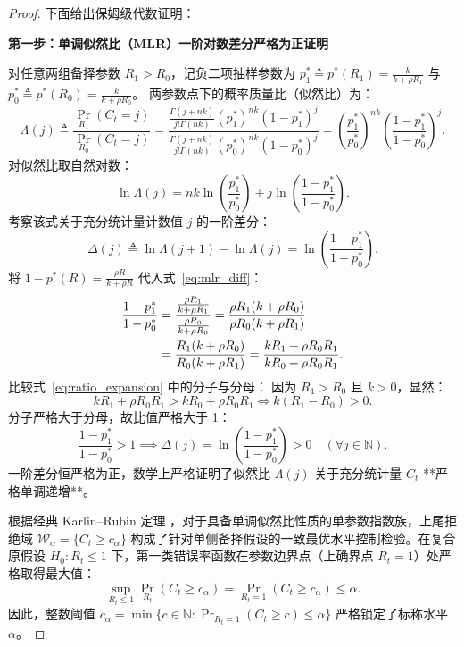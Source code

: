 \begin{proof}
下面给出保姆级代数证明：

\textbf{第一步：单调似然比（MLR）一阶对数差分严格为正证明}

对任意两组备择参数 $R_1 > R_0$，记负二项抽样参数为 $p_1^* \triangleq p^*(R_1) = \frac{k}{k + \rho R_1}$ 与 $p_0^* \triangleq p^*(R_0) = \frac{k}{k + \rho R_0}$。
两参数点下的概率质量比（似然比）为：
\begin{equation}
\Lambda(j) \triangleq \frac{\Pr_{R_1}(C_t = j)}{\Pr_{R_0}(C_t = j)} = \frac{\frac{\Gamma(j+nk)}{j!\Gamma(nk)} (p_1^*)^{nk} (1 - p_1^*)^j}{\frac{\Gamma(j+nk)}{j!\Gamma(nk)} (p_0^*)^{nk} (1 - p_0^*)^j} = \left( \frac{p_1^*}{p_0^*} \right)^{nk} \left( \frac{1 - p_1^*}{1 - p_0^*} \right)^j.
\end{equation}
对似然比取自然对数：
\begin{equation}
\ln \Lambda(j) = nk \ln\left( \frac{p_1^*}{p_0^*} \right) + j \ln\left( \frac{1 - p_1^*}{1 - p_0^*} \right).
\end{equation}
考察该式关于充分统计量计数值 $j$ 的一阶差分：
\begin{equation}
\Delta(j) \triangleq \ln \Lambda(j+1) - \ln \Lambda(j) = \ln\left( \frac{1 - p_1^*}{1 - p_0^*} \right). \label{eq:mlr_diff}
\end{equation}
将 $1 - p^*(R) = \frac{\rho R}{k + \rho R}$ 代入式~\eqref{eq:mlr_diff}：
\begin{align}
\frac{1 - p_1^*}{1 - p_0^*} &= \frac{\frac{\rho R_1}{k + \rho R_1}}{\frac{\rho R_0}{k + \rho R_0}} = \frac{\rho R_1 (k + \rho R_0)}{\rho R_0 (k + \rho R_1)} \notag \\
&= \frac{R_1(k + \rho R_0)}{R_0(k + \rho R_1)} = \frac{k R_1 + \rho R_0 R_1}{k R_0 + \rho R_0 R_1}. \label{eq:ratio_expansion}
\end{align}
比较式~\eqref{eq:ratio_expansion} 中的分子与分母：
因为 $R_1 > R_0$ 且 $k > 0$，显然：
\begin{equation}
k R_1 + \rho R_0 R_1 > k R_0 + \rho R_0 R_1 \iff k(R_1 - R_0) > 0.
\end{equation}
分子严格大于分母，故比值严格大于 1：
\begin{equation}
\frac{1 - p_1^*}{1 - p_0^*} > 1 \implies \Delta(j) = \ln\left( \frac{1 - p_1^*}{1 - p_0^*} \right) > 0 \quad (\forall j \in \mathbb{N}).
\end{equation}
一阶差分恒严格为正，数学上严格证明了似然比 $\Lambda(j)$ 关于充分统计量 $C_t$ **严格单调递增**。

根据经典 Karlin--Rubin 定理 \citep{karlin1956theory,lehmann2005testing}，对于具备单调似然比性质的单参数指数族，上尾拒绝域 $\mathcal{W}_\alpha = \{C_t \ge c_\alpha\}$ 构成了针对单侧备择假设的一致最优水平控制检验。在复合原假设 $H_0: R_t \le 1$ 下，第一类错误率函数在参数边界点（上确界点 $R_t = 1$）处严格取得最大值：
\begin{equation}
\sup_{R_t \le 1} \Pr_{R_t}(C_t \ge c_\alpha) = \Pr_{R_t = 1}(C_t \ge c_\alpha) \le \alpha.
\end{equation}
因此，整数阈值 $c_\alpha = \min\big\{ c \in \mathbb{N} : \Pr_{R_t=1}(C_t \ge c) \le \alpha \big\}$ 严格锁定了标称水平 $\alpha$。


\end{proof}
